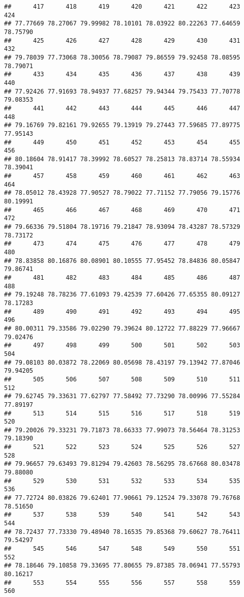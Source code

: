 \documentclass[
]{article}
\begin{document}
\begin{verbatim}
##      417      418      419      420      421      422      423      424 
## 77.77669 78.27067 79.99982 78.10101 78.03922 80.22263 77.64659 78.75790 
##      425      426      427      428      429      430      431      432 
## 79.78039 77.73068 78.30056 78.79087 79.86559 79.92458 78.08595 78.79071 
##      433      434      435      436      437      438      439      440 
## 77.92426 77.91693 78.94937 77.68257 79.94344 79.75433 77.70778 79.08353 
##      441      442      443      444      445      446      447      448 
## 79.16769 79.82161 79.92655 79.13919 79.27443 77.59685 77.89775 77.95143 
##      449      450      451      452      453      454      455      456 
## 80.18604 78.91417 78.39992 78.60527 78.25813 78.83714 78.55934 78.39041 
##      457      458      459      460      461      462      463      464 
## 78.05012 78.43928 77.90527 78.79022 77.71152 77.79056 79.15776 80.19991 
##      465      466      467      468      469      470      471      472 
## 79.66336 79.51804 78.19716 79.21847 78.93094 78.43287 78.57329 78.73172 
##      473      474      475      476      477      478      479      480 
## 78.83858 80.16876 80.08901 80.10555 77.95452 78.84836 80.05847 79.86741 
##      481      482      483      484      485      486      487      488 
## 79.19248 78.78236 77.61093 79.42539 77.60426 77.65355 80.09127 78.17283 
##      489      490      491      492      493      494      495      496 
## 80.00311 79.33586 79.02290 79.39624 80.12722 77.88229 77.96667 79.02476 
##      497      498      499      500      501      502      503      504 
## 79.08103 80.03872 78.22069 80.05698 78.43197 79.13942 77.87046 79.94205 
##      505      506      507      508      509      510      511      512 
## 79.62745 79.33631 77.62797 77.58492 77.73290 78.00996 77.55284 77.89197 
##      513      514      515      516      517      518      519      520 
## 79.20026 79.33231 79.71873 78.66333 77.99073 78.56464 78.31253 79.18390 
##      521      522      523      524      525      526      527      528 
## 79.96657 79.63493 79.81294 79.42603 78.56295 78.67668 80.03478 79.88080 
##      529      530      531      532      533      534      535      536 
## 77.72724 80.03826 79.62401 77.90661 79.12524 79.33078 79.76768 78.51650 
##      537      538      539      540      541      542      543      544 
## 78.72437 77.73330 79.48940 78.16535 79.85368 79.60627 78.76411 79.54297 
##      545      546      547      548      549      550      551      552 
## 78.18646 79.10858 79.33695 77.80655 79.87385 78.06941 77.55793 80.16217 
##      553      554      555      556      557      558      559      560 

\end{verbatim}
\end{document}
